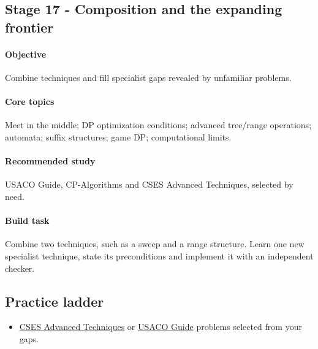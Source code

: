 \documentclass[11pt,letterpaper]{article}
\begin{document}
\par{}
\begin{samepage}
\section{Stage 17 - Composition and the expanding frontier}\label{sec:21}

\label{stage:17}


\paragraph*{Objective}

Combine techniques and fill specialist gaps revealed by unfamiliar problems.

\end{samepage}

\paragraph*{Core topics}

Meet in the middle; DP optimization conditions; advanced tree/range operations; automata; suffix structures; game DP; computational limits.

\paragraph*{Recommended study}

USACO Guide, CP-Algorithms and CSES Advanced Techniques, selected by need.

\paragraph*{Build task}

Combine two techniques, such as a sweep and a range structure. Learn one new specialist technique, state its preconditions and implement it with an independent checker.

\subsection*{Practice ladder}

\begin{itemize}

\item \href{https://cses.fi/problemset/}{CSES Advanced Techniques} or \href{https://usaco.guide/}{USACO Guide} problems selected from your gaps.

\end{itemize}
\end{document}
